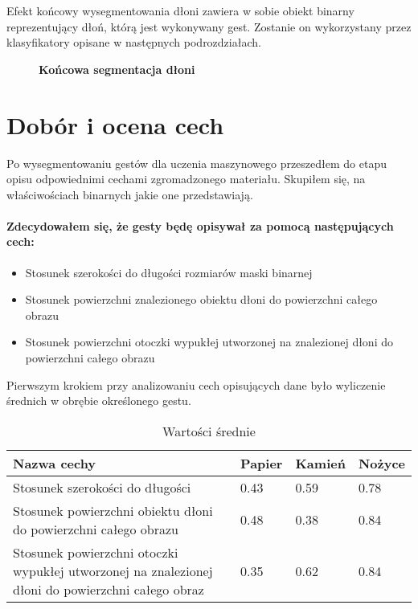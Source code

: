 \documentclass[a4paper,12pt,twoside,openany]{report}
\newcommand{\ImgPath}{.}
\begin{document}
Efekt końcowy wysegmentowania dłoni zawiera w sobie obiekt binarny reprezentujący dłoń, którą jest wykonywany gest. Zostanie on wykorzystany przez klasyfikatory opisane w następnych podrozdziałach.

\begin{figure}[H]
	\centering
	\caption{  \textbf{Końcowa segmentacja dłoni}}
\end{figure} 

\section{Dobór i ocena cech}
Po wysegmentowaniu gestów dla uczenia maszynowego przeszedłem do etapu opisu odpowiednimi cechami zgromadzonego materiału. Skupiłem się, na właściwościach binarnych jakie one przedstawiają.

\paragraph{Zdecydowałem się, że gesty będę opisywał za pomocą następujących cech:}
\begin{itemize}
	\item Stosunek szerokości do długości rozmiarów maski binarnej
	\item Stosunek powierzchni znalezionego obiektu dłoni do powierzchni całego obrazu
	\item Stosunek powierzchni otoczki wypukłej utworzonej na znalezionej dłoni do powierzchni całego obrazu
\end{itemize}

Pierwszym krokiem przy analizowaniu cech opisujących dane było wyliczenie średnich w obrębie określonego gestu.

\begin{table}[H]
	\centering
	\begin{tabularx}{\textwidth}{|X|l|l|l|}
		\hline
		\textbf{Nazwa cechy} & \textbf{Papier} & \textbf{Kamień} & \textbf{Nożyce} \\ 
		
		\hline
		Stosunek szerokości do długości & 0.43 & 0.59 & 0.78 \\ 
		
		\hline
		Stosunek powierzchni obiektu dłoni do powierzchni całego obrazu & 0.48 & 0.38 & 0.84 \\ 
		
		\hline
		Stosunek powierzchni otoczki wypukłej utworzonej na znalezionej dłoni do powierzchni całego obraz & 0.35 & 0.62 & 0.84 \\ 
		\hline
	\end{tabularx}

	\caption{Wartości średnie}
\end{table}
\end{document}
